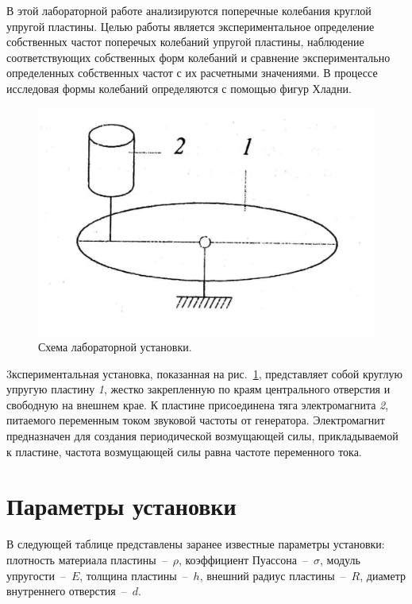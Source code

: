 \documentclass[12pt, a4paper]{article}
\begin{document}
    В этой лабораторной работе анализируются поперечные колебания круглой упругой пластины. Целью работы является экспериментальное определение собственных частот поперечых колебаний упругой пластины, наблюдение соответствующих собственных форм колебаний и сравнение экспериментально определенных собственных частот с их расчетными значениями. В процессе исследовая формы колебаний определяются с помощью фигур Хладни.
    
    \begin{figure} [h]
        \centering
        \includegraphics [width = 13cm] {Lab_7_1.png}
        \caption{\centering Схема лабораторной установки.}
        \label{im1}
    \end{figure}
    
    3кспериментальная установка, показанная на рис.~\ref{im1}, представляет собой круглую упругую пластину \textit{1}, жестко закрепленную по краям центрального отверстия и свободную на внешнем крае. К пластине присоединена тяга электромагнита \textit{2}, питаемого переменным током звуковой частоты от генератора. Электромагнит предназначен для создания периодической возмущающей силы, прикладываемой к пластине, частота возмущающей силы равна частоте переменного тока.
    
    \newpage
    
    \section{Параметры установки}
    
    В следующей таблице представлены заранее известные параметры установки: плотность материала пластины~--~$\rho$, коэффициент Пуассона~--~$\sigma$, модуль упругости~--~$E$, толщина пластины~--~$h$, внешний радиус пластины~--~$R$, диаметр внутреннего отверстия~--~$d$.
    
\end{document}
